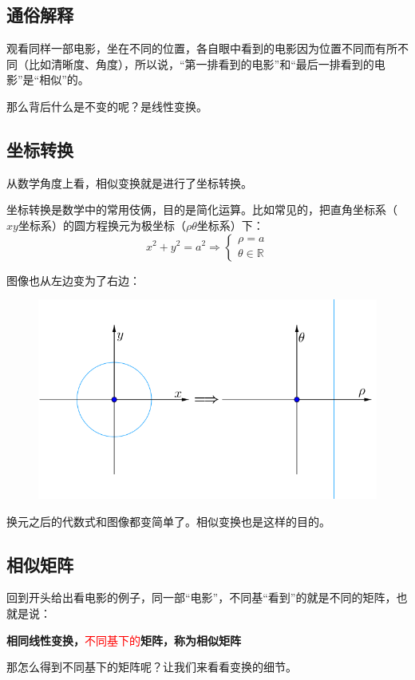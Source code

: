 \documentclass[12pt]{article}
\begin{document}
\subsection{通俗解释}
观看同样一部电影，坐在不同的位置，各自眼中看到的电影因为位置不同而有所不同（比如清晰度、角度），所以说，“第一排看到的电影”和“最后一排看到的电影”是“相似”的。

那么背后什么是不变的呢？是线性变换。

\subsection{坐标转换}
从数学角度上看，相似变换就是进行了坐标转换。

坐标转换是数学中的常用伎俩，目的是简化运算。比如常见的，把直角坐标系（$xy$坐标系）的圆方程换元为极坐标（$\rho\theta$坐标系）下：
$$
x^2 + y^2 = a^2 \Rightarrow \begin{cases}
\rho = a \\
\theta \in \mathbb{R}
\end{cases}
$$

图像也从左边变为了右边：
\begin{figure}[H]
    \centering
    \includegraphics[width=.5\textwidth]{fig/UnderstandSimilarMatrix_1.png}
\end{figure} 

换元之后的代数式和图像都变简单了。相似变换也是这样的目的。

\subsection{相似矩阵}
回到开头给出看电影的例子，同一部“电影”，不同基“看到”的就是不同的矩阵，也就是说：

\begin{center}
\textbf{相同线性变换，}\textcolor{red}{不同基下的}\textbf{矩阵，称为相似矩阵}
\end{center}

那怎么得到不同基下的矩阵呢？让我们来看看变换的细节。
\end{document}
